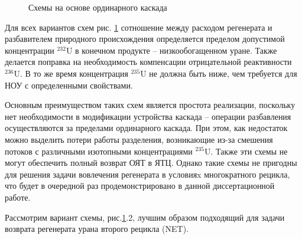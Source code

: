 \begin{figure}[ht]
  \caption{Схемы на основе ординарного каскада}\label{fig:diagram1}
\end{figure}

Для всех вариантов схем рис. \ref{fig:diagram1} сотношение между расходом регенерата и разбавителем природного происхождения определяется пределом допустимой концентрации $^{232}$U в конечном продукте -- низкообогащенном уране. Также делается поправка на необходимость компенсации отрицательной реактивности $^{236}$U. В то же время концентрация $^{235}$U не должна быть ниже, чем требуется для НОУ с определенными свойствами.

Основным преимуществом таких схем является простота реализации, поскольку нет необходимости в модификации устройства каскада -- операции разбавления осуществляются за пределами  ординарного каскада.
При этом, как недостаток можно выделить потери работы разделения, возникающие из-за смешения потоков с различными изотопными концентрациями $^{235}$U.
Также эти схемы не могут обеспечить полный возврат ОЯТ в ЯТЦ.
Однако такие схемы не пригодны для решения задачи вовлечения регенерата в условияx многократного рецикла, что будет в очередной раз продемонстрировано в данной диссертационной работе.

Рассмотрим вариант схемы, рис.\ref{fig:diagram1}.2, лучшим образом подходящий для задачи возврата регенерата урана второго рецикла (NET).

